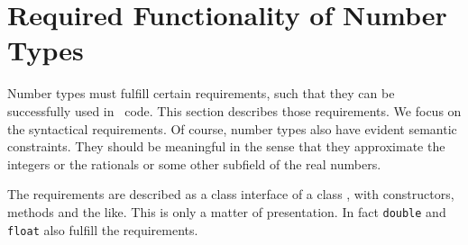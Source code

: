 \section{Required Functionality of Number Types\label{nt-requirements}}
Number types must fulfill certain requirements, such that they can
be successfully used in \cgal\ code.
This section describes those requirements.
We focus on the syntactical requirements. Of course, number types also
have evident semantic constraints. They should be meaningful in the
sense that they approximate the integers or the rationals 
or some other subfield of the real numbers.

The requirements are described as a class interface of a class
, with constructors, methods and the like. This is only a
matter of presentation.  In fact
{\tt double} and {\tt float} also fulfill the requirements.

